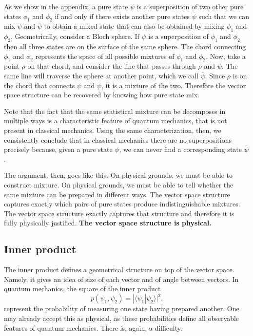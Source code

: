 \documentclass[10pt,twocolumn, nofootinbib]{revtex4-2}
\def\>{\rangle}
\def\<{\langle}
\begin{document}
As we show in the appendix, a pure state $\psi$ is a superposition of two other pure states $\phi_1$ and $\phi_2$ if and only if there exists another pure states $\bar{\psi}$ such that we can mix $\psi$ and $\bar{\psi}$ to obtain a mixed state that can also be obtained by mixing $\phi_1$ and $\phi_2$. Geometrically, consider a Bloch sphere. If $\psi$ is a superposition of $\phi_1$ and $\phi_2$ then all three states are on the surface of the same sphere. The chord connecting $\phi_1$ and $\phi_2$ represents the space of all possible mixtures of $\phi_1$ and $\phi_2$. Now, take a point $\rho$ on that chord, and consider the line that passes through $\rho$ and $\psi$. The same line will traverse the sphere at another point, which we call $\bar{\psi}$. Since $\rho$ is on the chord that connects $\psi$ and  $\bar{\psi}$, it is a mixture of the two. Therefore the vector space structure can be recovered by knowing how pure state mix.

Note that the fact that the same statistical mixture can be decomposes in multiple ways is a characteristic feature of quantum mechanics, that is not present in classical mechanics. Using the same characterization, then, we consistently conclude that in classical mechanics there are no superpositions precisely because, given a pure state $\psi$, we can never find a corresponding state $\bar{\psi}$.

The argument, then, goes like this. On physical grounds, we must be able to construct mixture. On physical grounds, we must be able to tell whether the same mixture can be prepared in different ways. The vector space structure captures exactly which pairs of pure states produce indistinguishable mixtures. The vector space structure exactly captures that structure and therefore it is fully physically justified. \textbf{The vector space structure is physical.}

\subsection{Inner product}

The inner product defines a geometrical structure on top of the vector space. Namely, it gives an idea of size of each vector and of angle between vectors. In quantum mechanics, the square of the inner product
\begin{equation}
	p(\psi_1, \psi_2) = |\<\psi_1| \psi_2\>|^2.
\end{equation}
represent the probability of measuring one state having prepared another. One may already accept this as physical, as these probabilities define all observable features of quantum mechanics. There is, again, a difficulty.
\end{document}
